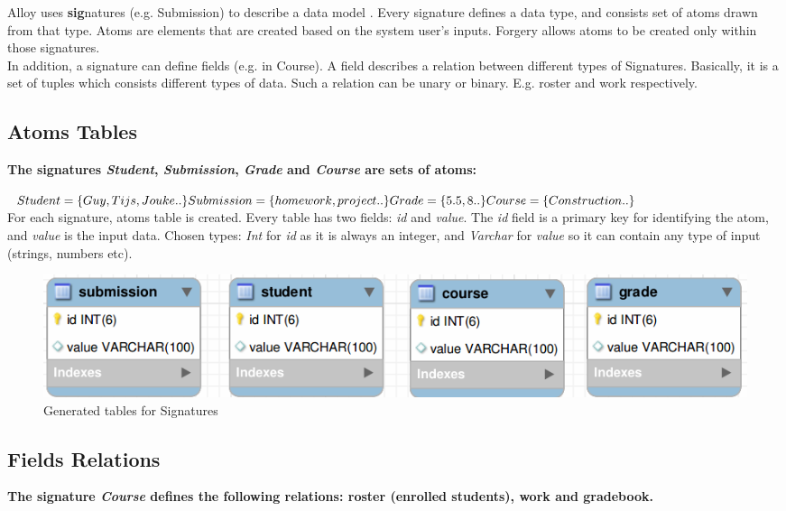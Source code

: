 \documentclass[oneside]{book}
\begin{document}
\noindent Alloy uses \textbf{sig}natures (e.g. Submission) to describe a data model \cite[p.~30]{alloy-manual}. Every signature defines a data type, and consists set of atoms drawn from that type. Atoms are elements that are created based on the system user's inputs. Forgery allows atoms to be created only within those signatures. \\

\noindent In addition, a signature can define fields (e.g. in Course). A field describes a relation between different types of Signatures. Basically, it is a set of tuples which consists different types of data. Such a relation can be unary or binary. E.g. roster and work respectively.

\newpage
\subsection{Atoms Tables}
\textbf{The signatures \textit{Student}, \textit{Submission}, \textit{Grade} and \textit{Course} are sets of atoms:}

\noindent$Student = \{Guy, Tijs, Jouke ..\}\\
Submission = \{homework, project ..\}\\
Grade = \{5.5, 8 ..\} \\
Course = \{Construction ..\}$\\

\noindent For each signature, atoms table is created. Every table has two fields: \textit{id} and \textit{value}.
The \textit{id} field is a primary key for identifying the atom, and \textit{value} is the input data.
Chosen types: \textit{Int} for \textit{id} as it is always an integer, and \textit{Varchar} for \textit{value} so it can contain any type of input (strings, numbers etc).

\begin{figure}[h!]
\centering
\includegraphics[scale=0.5]{1}
\caption{Generated tables for Signatures}
\end{figure}

\newpage
\subsection{Fields Relations}
\textbf{The signature \textit{Course} defines the following relations: roster (enrolled students), work and gradebook.}
\end{document}
